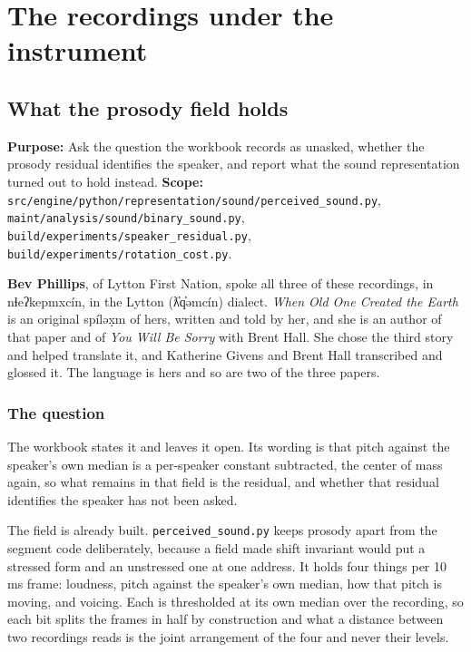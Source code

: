 \chapter{The recordings under the instrument}

\section{What the prosody field holds}

\textbf{Purpose:} Ask the question the workbook records as unasked, whether the prosody residual
identifies the speaker, and report what the sound representation turned out to hold instead.
\textbf{Scope:}
\texttt{src/\allowbreak{}engine/\allowbreak{}python/\allowbreak{}representation/\allowbreak{}sound/\allowbreak{}perceived\_\allowbreak{}sound.\allowbreak{}py},
\texttt{maint/\allowbreak{}analysis/\allowbreak{}sound/\allowbreak{}binary\_\allowbreak{}sound.\allowbreak{}py},
\texttt{build/\allowbreak{}experiments/\allowbreak{}speaker\_\allowbreak{}residual.\allowbreak{}py},
\texttt{build/\allowbreak{}experiments/\allowbreak{}rotation\_\allowbreak{}cost.\allowbreak{}py}.

\textbf{Bev Phillips}, of Lytton First Nation, spoke all three of these recordings, in
nɬeʔkepmxcín, in the Lytton (ƛ̓q̓əmcín) dialect. \emph{When Old One Created the Earth} is an
original spíləx̣m of hers, written and told by her, and she is an author of that paper and of
\emph{You Will Be Sorry} with Brent Hall. She chose the third story and helped translate it, and
Katherine Givens and Brent Hall transcribed and glossed it. The language is hers and so are two of
the three papers.

\subsection{The question}

The workbook states it and leaves it open. Its wording is that pitch against the speaker's own median
is a per-speaker constant subtracted, the center of mass again, so what remains in that
field is the residual, and whether that residual identifies the speaker has not been asked.

The field is already built.
\texttt{perceived\_\allowbreak{}sound.\allowbreak{}py} keeps prosody apart from the segment code
deliberately, because a field made shift invariant would put a stressed form and an unstressed one
at one address. It holds four things per 10 ms frame: loudness, pitch against the speaker's own
median, how that pitch is moving, and voicing. Each is thresholded at its own median over the
recording, so each bit splits the frames in half by construction and what a distance between two
recordings reads is the joint arrangement of the four and never their levels.

